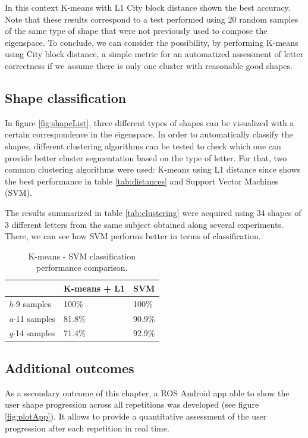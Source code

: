In this context K-means with L1 City block distance shown the best accuracy. Note that these results correspond to a test performed using 20 random samples of the same type of shape that were not previously used to compose the eigenspace. To conclude, we can consider the possibility, by performing K-means using City block distance, a simple metric for an automatized assessment of letter correctness if we assume there is only one cluster with reasonable good shapes.

\subsection{Shape classification}
In figure \ref{fig:shapeList}, three different types of shapes can be visualized with a certain correspondence in the eigenspace. In order to automatically classify the shapes, different clustering algorithms can be tested to check which one can provide better cluster segmentation based on the type of letter. For that, two common clustering algorithms were used: K-means using L1 distance since shows the best performance in table \ref{tab:distances} and Support Vector Machines (SVM).

The results summarized in table \ref{tab:clustering} were acquired using 34 shapes of 3 different letters from the same subject obtained along several experiments. There, we can see how SVM performs better in terms of classification.


\begin{table}[h!]
\centering
\begin{tabular}{l|l|l}
 		 		  & \textbf{K-means + L1}  & \textbf{SVM}	\\ \hline	
 \textit{h}-9 samples  	  &   100\% 	      &    100\% 	    \\ \hline
 \textit{a}-11 samples    &   81.8\%  	      &    90.9\%		\\ \hline
 \textit{g}-14 samples	  &   71.4\% 	      &    92.9\% 	     	

\end{tabular}
\caption{K-means - SVM classification performance comparison.}
\end{table}\label{tab:clustering}


\subsection{Additional outcomes}
As a secondary outcome of this chapter, a ROS Android app able to show the user shape progression across all repetitions was developed (see figure \ref{fig:plotApp}). It allows to provide a quantitative assessment of the user progression after each repetition in real time.

